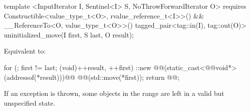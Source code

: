 {\color{addclr}
\begin{codeblock}
template <InputIterator I, Sentinel<I> S, NoThrowForwardIterator O>
  requires Constructible<value_type_t<O>, rvalue_reference_t<I>>() &&
           __ReferenceTo<O, value_type_t<O>>()
    tagged_pair<tag::in(I), tag::out(O)> uninitialized_move(I first, S last, O result);
\end{codeblock}
} %

\setcounter{Paras}{0}
\pnum
\effects Equivalent to:
\begin{codeblock}
        for (; first != last; (void)++result, ++first)
          ::new @@(static_cast<@@void*>(addressof(*result)))@\added{)}@
            @@(std::move(*first));
        return @@;
\end{codeblock}

\pnum
\remarks If an exception is thrown, some objects in the range \tcode{[first, last)} are left in a valid but
unspecified state.

